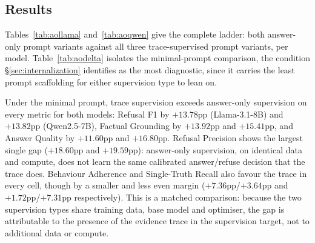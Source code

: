 \subsection{Results}

Tables~\ref{tab:aollama} and~\ref{tab:aoqwen} give the complete ladder: both
answer-only prompt variants against all three trace-supervised prompt
variants, per model. Table~\ref{tab:aodelta} isolates the minimal-prompt
comparison, the condition \S\ref{sec:internalization} identifies as the most
diagnostic, since it carries the least prompt scaffolding for either
supervision type to lean on.

\begin{table}[htbp]\centering

\caption{\textbf{Llama-3.1-8B: answer-only vs.\ trace supervision}, all five prompt$\times$supervision cells. Values are percentages, as reported by the evaluation harness.}
\label{tab:aollama}
\end{table}

\begin{table}[htbp]\centering

\caption{\textbf{Qwen2.5-7B: answer-only vs.\ trace supervision}, all five prompt$\times$supervision cells. Values are percentages, as reported by the evaluation harness.}
\label{tab:aoqwen}
\end{table}

\begin{table}[htbp]\centering

\caption{\textbf{Answer-only vs.\ trace supervision under the minimal prompt}, both models, with the percentage-point (pp) difference. AO is answer-only supervision.}
\label{tab:aodelta}
\end{table}

Under the minimal prompt, trace supervision exceeds answer-only supervision
on every metric for both models: Refusal F1 by $+13.78$pp (Llama-3.1-8B) and
$+13.82$pp (Qwen2.5-7B), Factual Grounding by $+13.92$pp and $+15.41$pp, and
Answer Quality by $+11.60$pp and $+16.80$pp. Refusal Precision shows the
largest single gap ($+18.60$pp and $+19.59$pp): answer-only supervision, on
identical data and compute, does not learn the same calibrated
answer/refuse decision that the trace does. Behaviour Adherence and
Single-Truth Recall also favour the trace in every cell, though by a smaller
and less even margin ($+7.36$pp/$+3.64$pp and $+1.72$pp/$+7.31$pp
respectively). This is a matched comparison: because the two supervision
types share training data, base model and optimiser, the gap is attributable
to the presence of the evidence trace in the supervision target, not to
additional data or compute.

